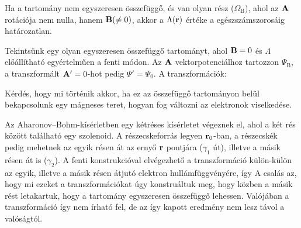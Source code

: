    Ha a tartomány nem egyszeresen összefüggő, és van olyan rész ($\Omega_\text{B}$), ahol az $\mathbf{A}$ rotációja nem nulla, hanem $\mathbf{B}(\ne 0)$, akkor a $\Lambda(\mathbf{r})$ értéke a
   egészszámszorosáig határozatlan. 
   
   Tekintsünk egy olyan egyszeresen összefüggő tartományt, ahol $\mathbf{B}=0$ és $\Lambda$ előállítható egyértelműen a fenti módon. Az $\mathbf{A}$ vektorpotenciálhoz tartozzon $\Psi_\text{B}$, a transzformált $\mathbf{A}'=0$-hot pedig $\Psi'=\Psi_0$. A transzformációk:
   
   Kérdés, hogy mi történik akkor, ha ez az összefüggő tartományon belül bekapcsolunk egy mágneses teret, hogyan fog változni az elektronok viselkedése. 
   
   Az Aharonov--Bohm-kísérletben egy kétréses kísérletet végeznek el, ahol a két rés között található egy szolenoid. A részecskeforrás legyen $\mathbf{r}_0$-ban, a részecskék pedig mehetnek az egyik résen át az ernyő $\mathbf{r}$ pontjára ($\gamma_1$ út), illetve a másik résen át is ($\gamma_2$). A fenti konstrukcióval elvégezhető a transzformáció külön-külön az egyik, illetve a másik résen átjutó elektron hullámfüggvényére, így
   A csalás az, hogy mi ezeket a transzformációkat úgy konstruáltuk meg, hogy közben a másik rést letakartuk, hogy a tartomány egyszeresen összefüggő lehessen. Valójában a transzformáció így nem írható fel, de az így kapott eredmény nem lesz távol a valóságtól.
   
